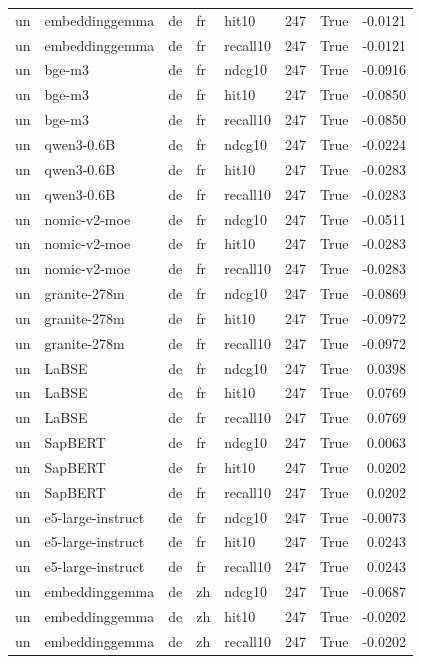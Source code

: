 \begin{tabular}{lllllrrr}
un & embeddinggemma & de & fr & hit10 & 247 & True & -0.0121 \\
un & embeddinggemma & de & fr & recall10 & 247 & True & -0.0121 \\
un & bge-m3 & de & fr & ndcg10 & 247 & True & -0.0916 \\
un & bge-m3 & de & fr & hit10 & 247 & True & -0.0850 \\
un & bge-m3 & de & fr & recall10 & 247 & True & -0.0850 \\
un & qwen3-0.6B & de & fr & ndcg10 & 247 & True & -0.0224 \\
un & qwen3-0.6B & de & fr & hit10 & 247 & True & -0.0283 \\
un & qwen3-0.6B & de & fr & recall10 & 247 & True & -0.0283 \\
un & nomic-v2-moe & de & fr & ndcg10 & 247 & True & -0.0511 \\
un & nomic-v2-moe & de & fr & hit10 & 247 & True & -0.0283 \\
un & nomic-v2-moe & de & fr & recall10 & 247 & True & -0.0283 \\
un & granite-278m & de & fr & ndcg10 & 247 & True & -0.0869 \\
un & granite-278m & de & fr & hit10 & 247 & True & -0.0972 \\
un & granite-278m & de & fr & recall10 & 247 & True & -0.0972 \\
un & LaBSE & de & fr & ndcg10 & 247 & True & 0.0398 \\
un & LaBSE & de & fr & hit10 & 247 & True & 0.0769 \\
un & LaBSE & de & fr & recall10 & 247 & True & 0.0769 \\
un & SapBERT & de & fr & ndcg10 & 247 & True & 0.0063 \\
un & SapBERT & de & fr & hit10 & 247 & True & 0.0202 \\
un & SapBERT & de & fr & recall10 & 247 & True & 0.0202 \\
un & e5-large-instruct & de & fr & ndcg10 & 247 & True & -0.0073 \\
un & e5-large-instruct & de & fr & hit10 & 247 & True & 0.0243 \\
un & e5-large-instruct & de & fr & recall10 & 247 & True & 0.0243 \\
un & embeddinggemma & de & zh & ndcg10 & 247 & True & -0.0687 \\
un & embeddinggemma & de & zh & hit10 & 247 & True & -0.0202 \\
un & embeddinggemma & de & zh & recall10 & 247 & True & -0.0202 \\

\end{tabular}

